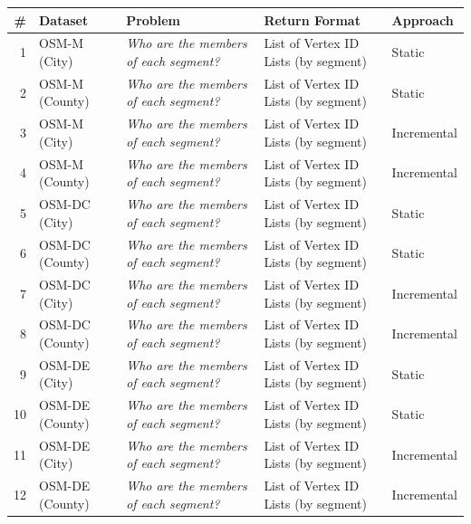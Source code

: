 \begin{table}[t]
    \begin{center}
    {\scriptsize
        \begin{tabular}{r|llll} 
            \textbf{\#}    & \textbf{Dataset} & \textbf{Problem} & \textbf{Return Format} & \textbf{Approach}\\
            \hline
            1           & OSM-M (City)       &\textit{Who are the members of each segment?} & List of Vertex ID Lists (by segment) & Static \\
            2           & OSM-M (County)     &\textit{Who are the members of each segment?} & List of Vertex ID Lists (by segment) & Static \\
            3           & OSM-M (City)       &\textit{Who are the members of each segment?} & List of Vertex ID Lists (by segment) & Incremental \\
            4           & OSM-M (County)     &\textit{Who are the members of each segment?} & List of Vertex ID Lists (by segment) & Incremental \\
            5           & OSM-DC (City)       &\textit{Who are the members of each segment?} & List of Vertex ID Lists (by segment) & Static \\
            6           & OSM-DC (County)     &\textit{Who are the members of each segment?} & List of Vertex ID Lists (by segment) & Static \\
            7           & OSM-DC (City)       &\textit{Who are the members of each segment?} & List of Vertex ID Lists (by segment) & Incremental \\
            8           & OSM-DC (County)     &\textit{Who are the members of each segment?} & List of Vertex ID Lists (by segment) & Incremental \\
            9           & OSM-DE (City)       &\textit{Who are the members of each segment?} & List of Vertex ID Lists (by segment) & Static \\
            10           & OSM-DE (County)    &\textit{Who are the members of each segment?} & List of Vertex ID Lists (by segment)  & Static \\
            11           & OSM-DE (City)       &\textit{Who are the members of each segment?} & List of Vertex ID Lists (by segment) & Incremental \\
            12           & OSM-DE (County)     &\textit{Who are the members of each segment?} & List of Vertex ID Lists (by segment) & Incremental \\

\end{tabular}}
\end{center}
\end{table}

